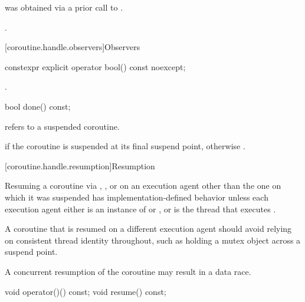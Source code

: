 \begin{itemdescr}
\pnum
\requires {} was obtained via a prior call to .

\pnum
\ensures {}.
\end{itemdescr}

[coroutine.handle.observers]{Observers}

%
\begin{itemdecl}
constexpr explicit operator bool() const noexcept;
\end{itemdecl}

\begin{itemdescr}
\pnum
\returns {}.
\end{itemdescr}

%
\begin{itemdecl}
bool done() const;
\end{itemdecl}

\begin{itemdescr}
\pnum
\requires {} refers to a suspended coroutine.

\pnum
\returns {} if the coroutine is suspended at its
final suspend point, otherwise .
\end{itemdescr}

[coroutine.handle.resumption]{Resumption}

\pnum
Resuming a coroutine via , , or 
on an execution agent other than the one on which it was suspended
has implementation-defined behavior unless
each execution agent either is
an instance of  or ,
or is the thread that executes .
\begin{note}
A coroutine that is resumed on a different execution agent should
avoid relying on consistent thread identity throughout, such as holding
a mutex object across a suspend point.
\end{note}
\begin{note}
A concurrent resumption of the coroutine may result in a data race.
\end{note}

%
%
\begin{itemdecl}
void operator()() const;
void resume() const;
\end{itemdecl}

